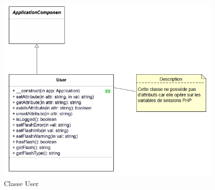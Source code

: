     \begin{figure}[h]
        \begin{center}
            \includegraphics[scale=1.0]{images/uml/classes/User.png} 
        \end{center}

        \caption{Classe User}
        \label{Classe User}
    \end{figure}
